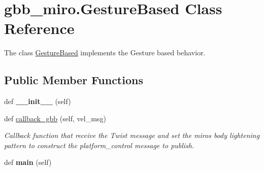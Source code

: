 \hypertarget{classgbb__miro_1_1GestureBased}{}\section{gbb\+\_\+miro.\+Gesture\+Based Class Reference}
\label{classgbb__miro_1_1GestureBased}


The class \mbox{\hyperlink{classgbb__miro_1_1GestureBased}{Gesture\+Based}} implements the Gesture based behavior.  


\subsection*{Public Member Functions}
\begin{DoxyCompactItemize}
\item 
\mbox{\label{classgbb__miro_1_1GestureBased_a07f79eb00b603ad746d6207e90cb7a7c}} 
def {\bfseries \+\_\+\+\_\+init\+\_\+\+\_\+} (self)
\item 
\mbox{\label{classgbb__miro_1_1GestureBased_a8e1b7b744c86c469224b221ba048c1eb}} 
def \mbox{\hyperlink{classgbb__miro_1_1GestureBased_a8e1b7b744c86c469224b221ba048c1eb}{callback\+\_\+gbb}} (self, vel\+\_\+msg)
\begin{DoxyCompactList}\small\item\em Callback function that receive the Twist message and set the miro\textquotesingle{}s body lightening pattern to construct the platform\+\_\+control message to publish. \end{DoxyCompactList}\item 
\mbox{\label{classgbb__miro_1_1GestureBased_a47f54767f7a09c1e316bfe935c553eb5}} 
def {\bfseries main} (self)
\end{DoxyCompactItemize}
